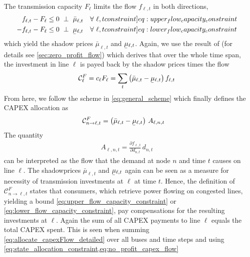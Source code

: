 \documentclass[11pt,twocolumn]{article}
\newcommand{\ubar}[1]{\underaccent{\bar}{#1}}
\newcommand{\resultsin}[1]{\hspace{6pt} \bot  \hspace{6pt} #1}
\newcommand{\Forall}[1]{\hspace{10pt} \forall \,\, #1 }
\newcommand{\pdv}[2]{\frac{\partial #1}{\partial #2}}
\newcommand{\flow}{f_{\ell,t}}
\newcommand{\capacityflow}{F_{\ell}}
\newcommand{\capitalpriceflow}{c_{\ell}}
\newcommand{\mulowerflow}{\ubar{\mu}_{\ell,t}}
\newcommand{\muupperflow}{\bar{\mu}_{\ell,t}}
\newcommand{\demand}[1][n]{d_{#1,t}}
\newcommand{\allocateflow}[1][n]{A_{\ell,#1,t}}
\newcommand{\allocatecapexflow}[1][n \rightarrow \ell]{\mathcal{C}^{F}_{#1,t}}
\newcommand{\capexflow}{\mathcal{C}^F}
\begin{document}
The transmission capacity $\capacityflow$ limits the flow $\flow$ in both directions,
\begin{align}
\flow - \capacityflow &\le 0 \resultsin{\muupperflow} \Forall{\ell,t} 
\label[constraint]{eq:upper_flow_capacity_constraint} \\
- \flow - \capacityflow &\le 0 \resultsin{\mulowerflow} \Forall{\ell,t} 
\label[constraint]{eq:lower_flow_capacity_constraint}
\end{align}
which yield the shadow prices $\muupperflow$ and $\mulowerflow$. Again, we use the result of \cite{brown_decreasing_2020} (for details see \cref{sec:zero_profit_flow}) which derives that over the whole time span, the investment in line $\ell$ is payed back by the shadow prices times the flow 
\begin{align}
\capexflow_\ell = \capitalpriceflow \capacityflow = \sum_{t} \left( \muupperflow - \mulowerflow \right)  \flow 
\label{eq:no_profit_capex_flow}
\end{align}
From here, we follow the scheme in \cref{eq:general_scheme} which finally defines the CAPEX allocation as 
\begin{align}
    \allocatecapexflow &=  
   \left( \muupperflow - \mulowerflow\right) \, \allocateflow
   \label{eq:allocate_capexFlow_detailed}
\end{align}
The quantity 
\begin{align}
 \allocateflow =  \pdv{\flow}{\demand}\, \demand
\end{align}
can be interpreted as the flow that the demand at node $n$ and time $t$ causes on line $\ell$.
The  shadowprices $\muupperflow$ and $\mulowerflow$ again can be seen as a measure for necessity of transmission investments at $\ell$ at time $t$. Hence, the definition of $\allocatecapexflow$ states that consumers, which retrieve power flowing on congested lines, yielding a bound \cref{eq:upper_flow_capacity_constraint} or \eqref{eq:lower_flow_capacity_constraint}, pay compensations for the resulting investments at $\ell$. Again the sum of all CAPEX payments to line $\ell$ equals the total CAPEX spent. This is seen when summing \cref{eq:allocate_capexFlow_detailed} over all buses and time steps and using \cref{eq:state_allocation_constraint,eq:no_profit_capex_flow}
\end{document}
